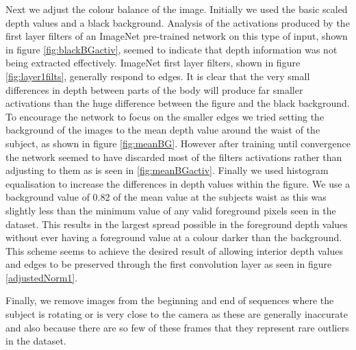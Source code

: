 \documentclass[11pt]{article} %
\begin{document}
Next we adjust the colour balance of the image. Initially we used the basic scaled depth values and a black background. Analysis of the activations produced by the first layer filters of an ImageNet pre-trained network on this type of input, shown in figure \ref{fig:blackBGactiv}, seemed to indicate that depth information was not being extracted effectively. ImageNet first layer filters, shown in figure \ref{fig:layer1filts}, generally respond to edges. It is clear that the very small differences in depth between parts of the body will produce far smaller activations than the huge difference between the figure and the black background. To encourage the network to focus on the smaller edges we tried setting the background of the images to the mean depth value around the waist of the subject, as shown in figure \ref{fig:meanBG}. However after training until convergence the network seemed to have discarded most of the filters activations rather than adjusting to them as is seen in \ref{fig:meanBGactiv}. Finally we used histogram equalisation to increase the differences in depth values within the figure. We use a background value of 0.82 of the mean value at the subjects waist as this was slightly less than the minimum value of any valid foreground pixels seen in the dataset. This results in the largest spread possible in the foreground depth values without ever having a foreground value at a colour darker than the background. This scheme seems to achieve the desired result of allowing interior depth values and edges to be preserved through the first convolution layer as seen in figure \ref{adjustedNorm1}.

Finally, we remove images from the beginning and end of sequences where the subject is rotating or is very close to the camera as these are generally inaccurate and also because there are so few of these frames that they represent rare outliers in the dataset. 
\end{document}
